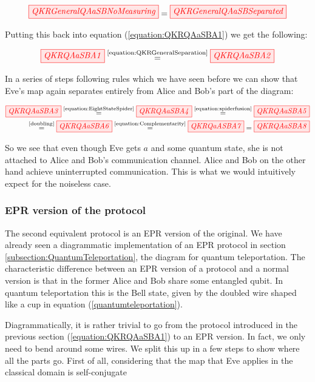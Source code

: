 \documentclass[]{article}
\newcommand{\equaltext}[1]{\ensuremath{\stackrel{\text{#1}}{=}}}
\begin{document}
\begin{equation}
	\label{equation:QKRGeneralSeparation}
	\tikzfig{QKRGeneralQAaSBNoMeasuring} = \tikzfig{QKRGeneralQAaSBSeparated}
\end{equation}

Putting this back into equation (\ref{equation:QKRQAaSBA1}) we get the following:

\begin{equation}
	\tikzfig{QKRQAaSBA1} \equaltext{\ref{equation:QKRGeneralSeparation}} \tikzfig{QKRQAaSBA2}
\end{equation}

In a series of steps following rules which we have seen before we can show that Eve's map again separates entirely from Alice and Bob's part of the diagram:

\begin{equation}
	\begin{aligned}
	\tikzfig{QKRQAaSBA3} \equaltext{\ref{equation:EightStateSpider}} \tikzfig{QKRQAaSBA4} \equaltext{\ref{equation:spiderfusion}} \tikzfig{QKRQAaSBA5} \\ \equaltext{\ref{doubling}} \tikzfig{QKRQAaSBA6} \equaltext{\ref{equation:Complementarity}} \tikzfig{QKRQaASBA7} = \tikzfig{QKRQAaSBA8}
	\end{aligned}
\end{equation}

So we see that even though Eve gets $a$ and some quantum state, she is not attached to Alice and Bob's communication channel. Alice and Bob on the other hand achieve uninterrupted communication. This is what we would intuitively expect for the noiseless case.

\subsubsection{EPR version of the protocol}

\label{section:eprqkr}
The second equivalent protocol is an EPR version of the original. We have already seen a diagrammatic implementation of an EPR protocol in section \ref{subsection:QuantumTeleportation}, the diagram for quantum teleportation. The characteristic difference between an EPR version of a protocol and a normal version is that in the former Alice and Bob share some entangled qubit. In quantum teleportation this is the Bell state, given by the doubled wire shaped like a cup in equation (\ref{quantumteleportation}).

Diagrammatically, it is rather trivial to go from the protocol introduced in the previous section (\ref{equation:QKRQAaSBA1}) to an EPR version. In fact, we only need to bend around some wires. We split this up in a few steps to show where all the parts go. First of all, considering that the map that Eve applies in the classical domain is self-conjugate
\end{document}

